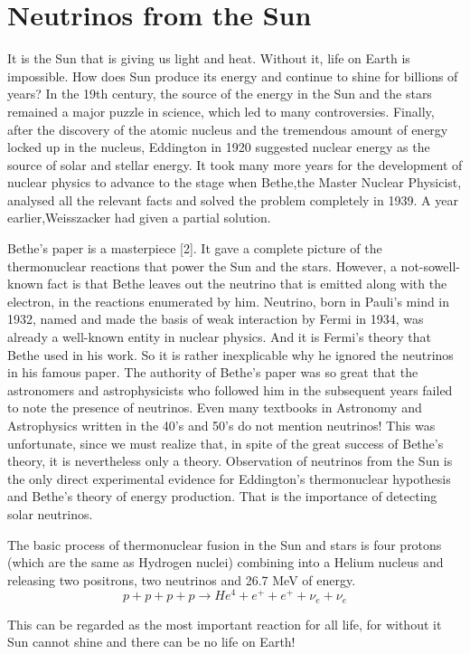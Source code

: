 \section{Neutrinos from the Sun}

It is the Sun that is giving us light and heat. Without it, life on Earth
is impossible. How does Sun produce its energy and continue to shine for
billions of years? In the 19th century, the source of the energy in the Sun and
the stars remained a major puzzle in science, which led to many controversies.
Finally, after the discovery of the atomic nucleus and the tremendous amount
of energy locked up in the nucleus, Eddington in 1920 suggested nuclear energy as the source of solar and stellar energy. It took many more years for the
development of nuclear physics to advance to the stage when Bethe,the Master Nuclear Physicist, analysed all the relevant facts and solved the problem
completely in 1939. A year earlier,Weisszacker had given a partial solution.

Bethe’s paper is a masterpiece [2]. It gave a complete picture of the thermonuclear reactions that power the Sun and the stars. However, a not-sowell-known fact is that Bethe leaves out the neutrino that is emitted along
with the electron, in the reactions enumerated by him. Neutrino, born in
Pauli’s mind in 1932, named and made the basis of weak interaction by
Fermi in 1934, was already a well-known entity in nuclear physics. And it
is Fermi’s theory that Bethe used in his work. So it is rather inexplicable
why he ignored the neutrinos in his famous paper. The authority of Bethe’s
paper was so great that the astronomers and astrophysicists who followed
him in the subsequent years failed to note the presence of neutrinos. Even
many textbooks in Astronomy and Astrophysics written in the 40’s and 50’s
do not mention neutrinos! This was unfortunate, since we must realize that,
in spite of the great success of Bethe’s theory, it is nevertheless only a theory. Observation of neutrinos from the Sun is the only direct experimental
evidence for Eddington’s thermonuclear hypothesis and Bethe’s theory of
energy production. That is the importance of detecting solar neutrinos.

The basic process of thermonuclear fusion in the Sun and stars is four
protons (which are the same as Hydrogen nuclei) combining into a Helium
nucleus and releasing two positrons, two neutrinos and 26.7 MeV of energy.
$$
p + p + p + p \rightarrow He^{4} + e^{+} +e^{+} + \nu_{e} + \nu_{e}
$$

This can be regarded as the most important reaction for all life, for without it Sun cannot shine and there can be no life on Earth!

